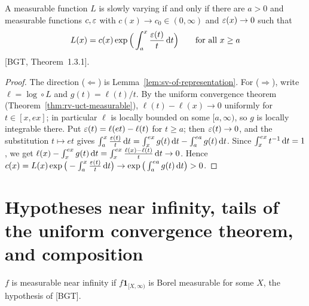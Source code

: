 \begin{theorem}
  \label{thm:karamata-representation}
  \leanok
  A measurable function $L$ is slowly varying if and only if there are $a > 0$ and measurable
  functions $c, \varepsilon$ with $c(x) \to c_0 \in (0,\infty)$ and $\varepsilon(x) \to 0$ such that
  \begin{align*}
    L(x) = c(x) \exp\Big( \int_a^x \frac{\varepsilon(t)}{t} \, \mathrm{d} t \Big) \qquad \text{for all } x \ge a
  \end{align*}
  [BGT, Theorem~1.3.1].
\end{theorem}
\begin{proof}
  \leanok
  The direction ($\Leftarrow$) is Lemma~\ref{lem:sv-of-representation}.
  For ($\Rightarrow$), write $\ell = \log \circ L$ and $g(t) = \ell(t)/t$. By the uniform
  convergence theorem (Theorem~\ref{thm:rv-uct-measurable}), $\ell(t) - \ell(x) \to 0$ uniformly
  for $t \in [x, e x]$; in particular $\ell$ is locally bounded on some $[a, \infty)$, so $g$ is
  locally integrable there. Put $\varepsilon(t) = \ell(e t) - \ell(t)$ for $t \ge a$; then
  $\varepsilon(t) \to 0$, and the substitution $t \mapsto e t$ gives
  $\int_a^x \frac{\varepsilon(t)}{t} \, \mathrm{d} t = \int_x^{e x} g(t) \, \mathrm{d} t - \int_a^{e a} g(t) \, \mathrm{d} t$.
  Since $\int_x^{ex} t^{-1} \, \mathrm{d} t = 1$, we get
  $\ell(x) - \int_x^{ex} g(t) \, \mathrm{d} t = \int_x^{ex} \frac{\ell(x) - \ell(t)}{t} \, \mathrm{d} t \to 0$.
  Hence $c(x) = L(x) \exp\big(-\int_a^x \frac{\varepsilon(t)}{t} \, \mathrm{d} t\big) \to \exp\big(\int_a^{ea} g(t)\, \mathrm{d} t\big) > 0$.
\end{proof}

\section{Hypotheses near infinity, tails of the uniform convergence theorem, and composition}

\begin{definition}
  \label{def:measurable-near-top}
  \leanok
  $f$ is measurable near infinity if $f \mathbf{1}_{[X, \infty)}$ is Borel measurable for some $X$, the
  hypothesis of [BGT].
\end{definition}


